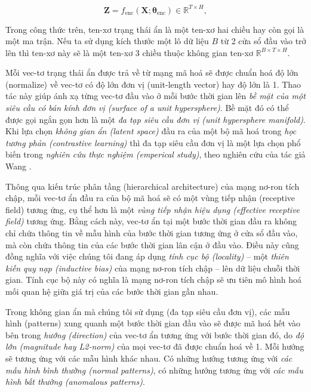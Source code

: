 \begin{equation}
\mathbf{Z}
=
f_{\mathrm{enc}}
\left(
    \mathbf{X};
    \boldsymbol{\theta}_{\mathrm{enc}}
\right)
\in
\mathbb{R}^{T\times H},
\end{equation}

Trong công thức trên, ten-xơ trạng thái ẩn là một ten-xơ hai chiều hay còn gọi là một ma trận. Nếu ta sử dụng kích thước một lô dữ liệu \(B\) từ 2 cửa sổ đầu vào trở lên thì ten-xơ này sẽ là một ten-xơ 3 chiều thuộc không gian ten-xơ \(\mathbb{R}^{B \times T\times H}\).

Mỗi vec-tơ trạng thái ẩn được trả về từ mạng mã hoá sẽ được chuẩn hoá độ lớn (normalize) về vec-tơ có độ lớn đơn vị (unit-length vector) hay độ lớn là 1. Thao tác này giúp ánh xạ từng vec-tơ đầu vào ở mỗi bước thời gian lên \textit{bề mặt của một siêu cầu có bán kính đơn vị (surface of a unit hypersphere)}. Bề mặt đó có thể được gọi ngắn gọn hơn là một \textit{đa tạp siêu cầu đơn vị (unit hypersphere manifold)}. Khi lựa chọn \textit{không gian ẩn (latent space)} đầu ra của một bộ mã hoá trong \textit{học tương phản (contrastive learning)} thì đa tạp siêu cầu đơn vị là một lựa chọn phổ biến trong \textit{nghiên cứu thực nghiệm (emperical study)}, theo nghiên cứu của tác giả Wang \cite{3524938.3525859}.

Thông qua kiến trúc phân tầng (hierarchical architecture) của mạng nơ-ron tích chập, mỗi vec-tơ ẩn đầu ra của bộ mã hoá sẽ có một vùng tiếp nhận (receptive field) tương ứng, cụ thể hơn là một \textit{vùng tiếp nhận hiệu dụng (effective receptive field)} tương ứng. Bằng cách này, vec-tơ ẩn tại một bước thời gian đầu ra không chỉ chứa thông tin về mẫu hình của bước thời gian tương ứng ở cửa sổ đầu vào, mà còn chứa thông tin của các bước thời gian lân cận ở đầu vào. Điều này cũng đồng nghĩa với việc chúng tôi đang áp dụng \textit{tính cục bộ (locality)} -- một \textit{thiên kiến quy nạp (inductive bias)} của mạng nơ-ron tích chập -- lên dữ liệu chuỗi thời gian. Tính cục bộ này có nghĩa là mạng nơ-ron tích chập sẽ ưu tiên mô hình hoá mối quan hệ giữa giá trị của các bước thời gian gần nhau.

Trong không gian ẩn mà chúng tôi sử dụng (đa tạp siêu cầu đơn vị), các mẫu hình (patterns) xung quanh một bước thời gian đầu vào sẽ được mã hoá hết vào bên trong \textit{hướng (direction)} của vec-tơ ẩn tương ứng với bước thời gian đó, do \textit{độ lớn (magnitude hay L2-norm)} của mọi vec-tơ đã được chuẩn hoá về 1. Mỗi hướng sẽ tương ứng với các mẫu hình khác nhau. Có những hướng tương ứng với \textit{các mẫu hình bình thường (normal patterns)}, có những hướng tương ứng với \textit{các mẫu hình bất thường (anomalous patterns)}.

